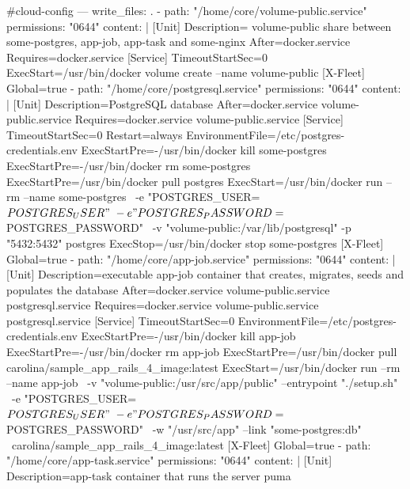 \begin{codelisting}
\label{code:vagrantfile2}
\begin{code}
#cloud-config
---
write_files:
  .
  - path: "/home/core/volume-public.service"
    permissions: "0644"
    content: |
      [Unit] 
      Description= volume-public share between some-postgres, app-job, app-task 
                   and some-nginx 
      After=docker.service
      Requires=docker.service
      [Service] 
      TimeoutStartSec=0 
      ExecStart=/usr/bin/docker volume create --name volume-public
      [X-Fleet]
      Global=true
  - path: "/home/core/postgresql.service"
    permissions: "0644"
    content: |
      [Unit] 
      Description=PostgreSQL database 
      After=docker.service volume-public.service
      Requires=docker.service volume-public.service
      [Service] 
      TimeoutStartSec=0
      Restart=always
      EnvironmentFile=/etc/postgres-credentials.env
      ExecStartPre=-/usr/bin/docker kill some-postgres 
      ExecStartPre=-/usr/bin/docker rm some-postgres 
      ExecStartPre=/usr/bin/docker pull postgres 
      ExecStart=/usr/bin/docker run --rm --name some-postgres \
      -e "POSTGRES_USER=${POSTGRES_USER}" \
      -e "POSTGRES_PASSWORD=${POSTGRES_PASSWORD}" \
      -v "volume-public:/var/lib/postgresql" -p "5432:5432" postgres 
      ExecStop=/usr/bin/docker stop some-postgres
      [X-Fleet]
      Global=true
  - path: "/home/core/app-job.service"
    permissions: "0644"
    content: |
      [Unit] 
      Description=executable app-job container that creates, migrates, seeds and 
                  populates the database
      After=docker.service volume-public.service postgresql.service
      Requires=docker.service volume-public.service postgresql.service
      [Service] 
      TimeoutStartSec=0 
      EnvironmentFile=/etc/postgres-credentials.env
      ExecStartPre=-/usr/bin/docker kill app-job 
      ExecStartPre=-/usr/bin/docker rm app-job 
      ExecStartPre=/usr/bin/docker pull carolina/sample_app_rails_4_image:latest 
      ExecStart=/usr/bin/docker run --rm --name app-job \
      -v "volume-public:/usr/src/app/public" --entrypoint "./setup.sh" \
      -e "POSTGRES_USER=${POSTGRES_USER}" \
      -e "POSTGRES_PASSWORD=${POSTGRES_PASSWORD}" \
      -w "/usr/src/app" --link "some-postgres:db" \
      carolina/sample_app_rails_4_image:latest
      [X-Fleet]
      Global=true
  - path: "/home/core/app-task.service"
    permissions: "0644"
    content: |
      [Unit] 
      Description=app-task container that runs the server puma

\end{code}
\end{codelisting}
